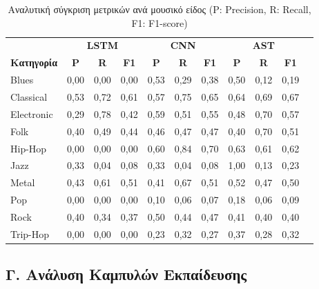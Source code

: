 \documentclass[a4paper,12pt]{article}
\begin{document}
\begin{table}[H]
    \centering
    \tiny
    \begin{tabular}{@{}lcccccccccc@{}}
        \toprule
        & \multicolumn{3}{c}{\textbf{LSTM}} & \multicolumn{3}{c}{\textbf{CNN}} & \multicolumn{3}{c}{\textbf{AST}} \\
        \cmidrule(lr){2-4} \cmidrule(lr){5-7} \cmidrule(lr){8-10}
        \textbf{Κατηγορία} & \textbf{P} & \textbf{R} & \textbf{F1} & \textbf{P} & \textbf{R} & \textbf{F1} & \textbf{P} & \textbf{R} & \textbf{F1} \\
        \midrule
        Blues & 0,00 & 0,00 & 0,00 & 0,53 & 0,29 & 0,38 & 0,50 & 0,12 & 0,19 \\
        Classical & 0,53 & 0,72 & 0,61 & 0,57 & 0,75 & 0,65 & 0,64 & 0,69 & 0,67 \\
        Electronic & 0,29 & 0,78 & 0,42 & 0,59 & 0,51 & 0,55 & 0,48 & 0,70 & 0,57 \\
        Folk & 0,40 & 0,49 & 0,44 & 0,46 & 0,47 & 0,47 & 0,40 & 0,70 & 0,51 \\
        Hip-Hop & 0,00 & 0,00 & 0,00 & 0,60 & 0,84 & 0,70 & 0,63 & 0,61 & 0,62 \\
        Jazz & 0,33 & 0,04 & 0,08 & 0,33 & 0,04 & 0,08 & 1,00 & 0,13 & 0,23 \\
        Metal & 0,43 & 0,61 & 0,51 & 0,41 & 0,67 & 0,51 & 0,52 & 0,47 & 0,50 \\
        Pop & 0,00 & 0,00 & 0,00 & 0,10 & 0,06 & 0,07 & 0,18 & 0,06 & 0,09 \\
        Rock & 0,40 & 0,34 & 0,37 & 0,50 & 0,44 & 0,47 & 0,41 & 0,40 & 0,40 \\
        Trip-Hop & 0,00 & 0,00 & 0,00 & 0,23 & 0,32 & 0,27 & 0,37 & 0,28 & 0,32 \\
        \bottomrule
    \end{tabular}
    \caption{Αναλυτική σύγκριση μετρικών ανά μουσικό είδος (P: Precision, R: Recall, F1: F1-score)}
\end{table}

\subsection*{Γ. Ανάλυση Καμπυλών Εκπαίδευσης}
\end{document}
